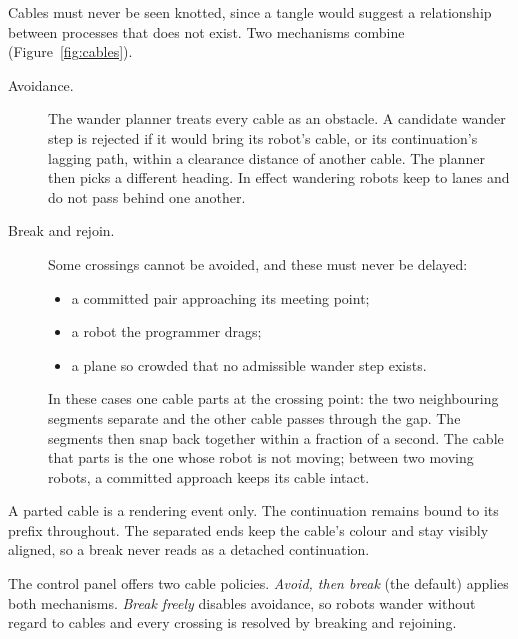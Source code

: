 \documentclass[11pt]{article}
\begin{document}
Cables must never be seen knotted, since a tangle would suggest a relationship between processes
that does not exist. Two mechanisms combine (Figure~\ref{fig:cables}).
\begin{description}
  \item[Avoidance.] The wander planner treats every cable as an obstacle. A candidate wander step
    is rejected if it would bring its robot's cable, or its continuation's lagging path, within a
    clearance distance of another cable. The planner then picks a different heading. In effect
    wandering robots keep to lanes and do not pass behind one another.
  \item[Break and rejoin.] Some crossings cannot be avoided, and these must never be delayed:
    \begin{itemize}
      \item a committed pair approaching its meeting point;
      \item a robot the programmer drags;
      \item a plane so crowded that no admissible wander step exists.
    \end{itemize}
    In these cases one cable parts at the crossing point: the two neighbouring segments separate
    and the other cable passes through the gap. The segments then snap back together within a
    fraction of a second. The cable that parts is the one whose robot is not moving; between two
    moving robots, a committed approach keeps its cable intact.
\end{description}
A parted cable is a rendering event only. The continuation remains bound to its prefix
throughout. The separated ends keep the cable's colour and stay visibly aligned, so a break
never reads as a detached continuation.

The control panel offers two cable policies. \emph{Avoid, then break} (the default) applies
both mechanisms. \emph{Break freely} disables avoidance, so robots wander without regard to
cables and every crossing is resolved by breaking and rejoining.
\end{document}
